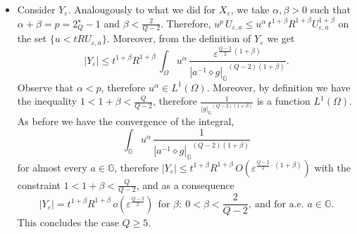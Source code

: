 \documentclass[11pt]{amsart}
\numberwithin{equation}{section} %
\theoremstyle{definition}
\newcommand{\al}{\alpha}
\newcommand{\be}{\beta}
\def\G{\mathbb{G}}
\newcommand{\m}{\mbox}
\begin{document}
\begin{enumerate}
\begin{itemize}
    By definition $1+\alpha<p+1=2^\star_Q$,
    this implies that $u^{1+\alpha}$ is in $L^1(\Omega)$ because
    $u\in S^1_0(\Omega)\Subset L^{2^\star_Q}(\Omega)$.
    Moreover, $\frac{1}{{|g|_{\mathbb{G}}}^{\beta (Q-2)}}$ is an $L^1$ function as well,
    because
     $\beta(Q-2) <Q$, the homogeneous dimension of $\G$.
    We can conclude by observing that 
    for almost every $a\in\G$,
    \[
    \int_\G u^{1+\alpha}\, \frac{1}{{|a^{-1}\diamond g|_{\mathbb{G}}}^{Q-2}}<\infty.
    \]
    Indeed, this is the convolution $(u^{1+\al}\star f)(a)$ where 
    $f(g):=\frac{1}{{|g^{-1}|_{\mathbb{G}}}^{Q-2}}$,
    and by \cite[Proposition 1.19]{Folland} it has finite
    value for a.e.~$a\in\G$.
  Therefore, we conclude that 
  $|X_\varepsilon|\leq t^{\beta} R^{\beta}\, O\left(\varepsilon^{\beta\,\frac{Q-2}{2}}\right)$ 
  for any~$\beta<\frac{Q}{Q-2}$, that gives
    \[
    |X_\varepsilon|=t^\beta R^\beta \, o(\varepsilon^{\frac{Q-2}{2}})\ \ \ \m{for }\beta:\ 1<\beta<\frac{Q}{Q-2}\ \m{and a.e. }a\in\G.
    \]\newline
    \item Consider $Y_\varepsilon$. Analougously to what we did for $X_\varepsilon$,
     we take $\al,\beta>0$ such that $\al+\beta=p=2^\star_Q-1$ and $\beta<\frac{2}{Q-2}$. 
     Therefore, $u^p\, U_{\varepsilon,a}\leq u^\al\, t^{1+\be}R^{1+\be}U_{\varepsilon,a}^{1+\be}$ 
     on the set $\{u<tRU_{\varepsilon,a}\}$.
    Moreover, from the definition of $Y_\varepsilon$ we get
    \[
    |Y_\varepsilon|\leq t^{1+\beta}R^{1+\beta}\,
    \int_\Omega u^\al\, \frac{\varepsilon^{\frac{Q-2}{2}\,(1+\be)}}{{|a^{-1}\diamond g|_{\mathbb{G}}}^{(Q-2)(1+\be)}}.
    \]
    Observe that $\al<p$, therefore $u^\al\in L^1(\Omega)$.
    Moreover, by definition we have the inequality $1<1+\be<\frac{Q}{Q-2}$, 
    therefore $\frac{1}{{|g|_{\mathbb{G}}}^{(Q-2)(1+\be)}}$ is a function $L^1(\Omega)$.
    As before we have the convergence of the integral,
    \[
    \int_\G u^\al\,\frac{1}{{|a^{-1}\diamond g|_{\mathbb{G}}}^{(Q-2)(1+\be)}}
    \]
    for almost every $a\in \G$,
    therefore $|Y_\varepsilon|\leq t^{1+\be}R^{1+\be}\, O\left(\varepsilon^{\frac{Q-2}{2}\cdot(1+\be)}\right)$ 
    with the constraint $1<1+\be<\frac{Q}{Q-2}$, and as a consequence
    \[
    |Y_\varepsilon|=t^{1+\be}R^{1+\be}\, o\left(\varepsilon^{\frac{Q-2}{2}}\right)\ \ \m{for }\be:\ 0<\be<\frac{2}{Q-2},\ \m{and for a.e. }a\in\G.
    \]
    This concludes the case $Q\geq5$.\newline
\end{itemize}


\end{enumerate}
\end{document}
